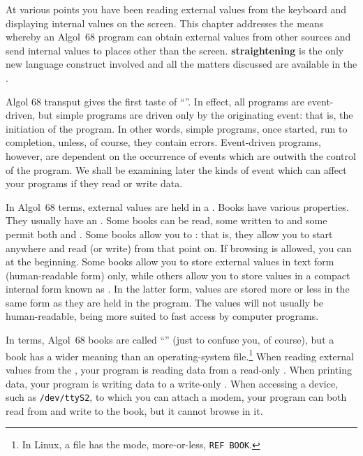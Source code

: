 %
%
%
At various points you have been reading external values from the
keyboard and displaying internal values on the screen. This chapter
addresses the means whereby an Algol~68 program can obtain external
values from other sources and send internal values to places other
than the screen.  \textbf{straightening} is the only new language
construct involved and all the matters discussed are available in
the .

Algol 68 transput gives the first taste of
``''.
In effect, all programs are event-driven, but simple programs are
driven only by the originating event: that is, the initiation of the
program.  In other words, simple programs, once started, run to
completion, unless, of course, they contain errors. Event-driven
programs, however, are dependent on the occurrence of events which
are outwith the control of the program. We shall be examining later
the kinds of event which can affect your programs if they read or
write data.

In Algol~68 terms, external values are held in a . Books
have various properties. They usually have an
. Some books can be read,
some written to and some permit both  and .
Some books allow you to : that is, they allow
you to start anywhere and read (or write) from that point on.  If
browsing is allowed, you can  at the beginning. Some
books allow you to store external values in text form (human-readable
form) only, while others allow you to store values in a compact
internal form known as .  In the latter form, values are
stored more or less in the same form as they are held in the program.
The values will not usually be human-readable, being more suited to
fast access by computer programs.

In  terms, Algol~68 books are called
``'' (just to confuse you, of course), but a book has a
wider meaning than an operating-system file.\footnote{In Linux, a
file has the mode, more-or-less, \texttt{REF BOOK}.} When reading
external values from the , your program is reading data
from a read-only .  When printing data,
your program is writing data to a write-only
.  When accessing a device, such as
\verb|/dev/ttyS2|, to which you can attach a modem, your program can
both read from and write to the book, but it cannot browse in it.

